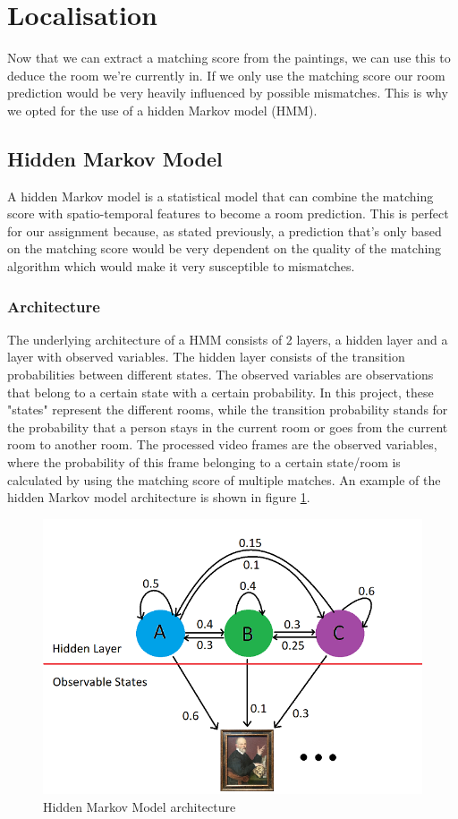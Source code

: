 \section{Localisation}
\label{sec:localisation}

Now that we can extract a matching score from the paintings, we can use this to deduce the room we're currently in. If we only use the matching score our room prediction would be very heavily influenced by possible mismatches. This is why we opted for the use of a hidden Markov model (HMM).

\subsection{Hidden Markov Model}
A hidden Markov model is a statistical model that can combine the matching score with spatio-temporal features to become a room prediction. This is perfect for our assignment because, as stated previously, a prediction that's only based on the matching score would be very dependent on the quality of the matching algorithm which would make it very susceptible to mismatches.

\subsubsection{Architecture}
The underlying architecture of a HMM consists of 2 layers, a hidden layer and a layer with observed variables. The hidden layer consists of the transition probabilities between different states. The observed variables are observations that belong to a certain state with a certain probability. In this project, these "states" represent the different rooms, while the transition probability stands for the probability that a person stays in the current room or goes from the current room to another room. The processed video frames are the observed variables, where the probability of this frame belonging to a certain state/room is calculated by using the matching score of multiple matches. An example of the hidden Markov model architecture is shown in figure \ref{fig:hmm}.


\begin{figure}[htbp]
    \includegraphics[width=\linewidth]{images/hmm.png}
    \caption{Hidden Markov Model architecture}
    \label{fig:hmm}
\end{figure}

